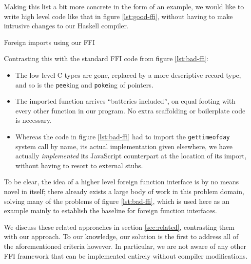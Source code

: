 \documentclass[preprint]{sigplanconf}
\begin{document}
Making this list a bit more concrete in the form of an example, we would like
to write high level code like that in figure \ref{lst:good-ffi}, without
having to make intrusive changes to our Haskell compiler.

\begin{listingfloat}
\caption{Foreign imports using our FFI}
\label{lst:good-ffi}
\end{listingfloat}

Contrasting this with the standard FFI code from figure \ref{lst:bad-ffi}:

\begin{itemize}
\item
  The low level C types are gone, replaced by a more descriptive record type,
  and so is the \lstinline!peek!ing and \lstinline!poke!ing of pointers.
\item
  The imported function arrives ``batteries included'', on equal footing with
  every other function in our program. No extra scaffolding or boilerplate
  code is necessary.
\item
  Whereas the code in figure \ref{lst:bad-ffi} had to import the
  \lstinline!gettimeofday! system call by name, its actual implementation
  given elsewhere, we have actually \emph{implemented} its JavaScript
  counterpart at the location of its import, without having to resort to
  external stubs.
\end{itemize}

To be clear, the idea of a higher level foreign function interface is by no
means novel in itself;
there already exists a large body of work in this problem domain, solving many
of the problems of figure \ref{lst:bad-ffi},
which is used here as an example mainly to
establish the baseline for foreign function interfaces.

We discuss these related approaches in section \ref{sec:related}, contrasting
them with our approach. To our knowledge, our solution is the first to address
all of the aforementioned criteria however.
In particular, we are not aware of any other FFI framework that can be
implemented entirely without compiler modifications.
\end{document}
